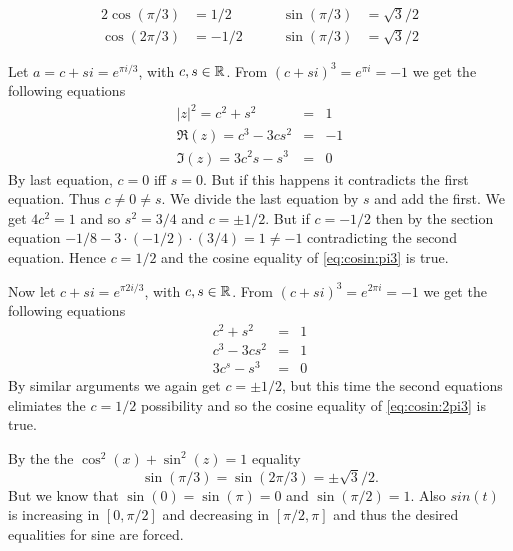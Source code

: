 \begin{llem} \label{llem:trig:cos:sin}
\begin{alignat}{2}
 \cos(\pi/3)  & =  1/2   &\qquad \sin(\pi/3) & = \sqrt{3}/2
    \label{eq:cosin:pi3} \\
 \cos(2\pi/3) & = -1/2   &\qquad \sin(\pi/3) & = \sqrt{3}/2
    \label{eq:cosin:2pi3}
\end{alignat}
\end{llem}
\begin{thmproof}
Let \(a = c+si = e^{\pi i/3}\), with \(c,s\in\mathbb{R}\).
From \((c+si)^3 = e^{\pi i} = -1\)
we get the following equations
\begin{eqnarray*}
|z|^2 =  c^2 + s^2   &=& 1 \\
\Re(z) = c^3 - 3cs^2 &=& -1 \\
\Im(z) = 3c^2s - s^3  &=& 0
\end{eqnarray*}
By last equation, 
\(c=0\) iff \(s=0\). But if this happens it contradicts the first equation.
Thus \(c\neq 0 \neq s\).
We divide the last equation by $s$ and add the first.
We get \(4c^2 = 1\) and so \(s^2= 3/4\) and \(c=\pm1/2\).
But if \(c = -1/2\) then by the section equation
\(-1/8 - 3\cdot(-1/2)\cdot(3/4) = 1 \neq -1\) contradicting the second equation.
Hence \(c=1/2\) and the cosine equality of \eqref{eq:cosin:pi3} is true.


Now let \(c+si = e^{\pi 2i/3}\), with \(c,s\in\mathbb{R}\). 
From \((c+si)^3 = e^{2\pi i} =-1\)
we get the following equations
\begin{eqnarray*}
c^2 + s^2   &=& 1 \\
c^3 - 3cs^2 &=& 1 \\
3c^s - s^3  &=& 0
\end{eqnarray*}
By similar arguments we again get \(c=\pm1/2\), but this time
the second equations elimiates the \(c=1/2\) possibility and
so the cosine equality of \eqref{eq:cosin:2pi3} is true.

By the the \(\cos^2(x) + \sin^2(z) = 1\) equality
\begin{equation*}
 \sin(\pi/3) = \sin(2\pi/3) = \pm\sqrt{3}/2.
\end{equation*}
But we know that \(\sin(0) = \sin(\pi) = 0\)
and \(\sin(\pi/2) = 1\). Also \(sin(t)\) is increasing 
in \([0,\pi/2]\) and decreasing in \([\pi/2,\pi]\)
and thus the desired equalities for sine are forced.
\end{thmproof}


